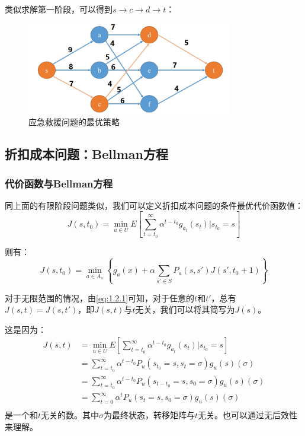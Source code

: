\begin{example}
    类似求解第一阶段，可以得到$s\rightarrow c\rightarrow d\rightarrow t$：

    \begin{figure}[ht]
        \centering
        \includegraphics[width=0.8\textwidth]{pic/1.2.2.png}
        \caption{应急救援问题的最优策略}
    \end{figure}

\end{example}

\subsection{折扣成本问题：Bellman方程}

\subsubsection{代价函数与Bellman方程}

同上面的有限阶段问题类似，我们可以定义折扣成本问题的条件最优代价函数值：
\begin{equation}
    J(s,t_0)=\min_{u\in U}E[\sum_{t=t_0}^{\infty}\alpha^{t-t_0}g_{a_t}(s_t)|s_{t_0}=s]
    \label{eq:1.2.1}
\end{equation}

则有：
\begin{equation}
    J(s,t_0)=\min_{a\in A_s}\left\{ g_a(x)+\alpha\sum_{s'\in S}P_a(s,s')J(s',t_0+1)\right\}
\end{equation}

对于无限范围的情况，由\ref{eq:1.2.1}可知，对于任意的$t$和$t'$，总有$J(s,t)=J(s,t')$，即$J(s,t)$与$t$无关，我们可以将其简写为$J(s)$。

这是因为：
\begin{equation}
    \begin{aligned}
        J(s,t) & = \min_{u\in U}E[\sum_{t=t_0}^{\infty}\alpha^{t-t_0}g_{a_t}(s_t)|s_{t_0}=s]    \\
               & = \sum_{t=t_0}^{\infty}\alpha^{t-t_0}P_u(s_{t_0}=s,s_t=\sigma)g_u(s)(\sigma)   \\
               & = \sum_{t=t_0}^{\infty}\alpha^{t-t_0}P_u(s_{t-t_0}=s,s_0=\sigma)g_u(s)(\sigma) \\
               & = \sum_{t=0}^{\infty}\alpha^{t}P_u(s_{t}=s,s_0=\sigma)g_u(s)(\sigma)           \\
    \end{aligned}
\end{equation}
是一个和$t$无关的数。其中$\sigma$为最终状态，转移矩阵与$t$无关。也可以通过无后效性来理解。

